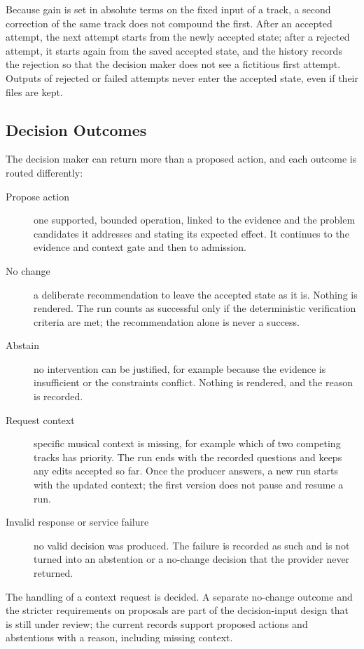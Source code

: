 Because gain is set in absolute terms on the fixed input of a track, a second correction of the same track does not compound the first. After an accepted attempt, the next attempt starts from the newly accepted state; after a rejected attempt, it starts again from the saved accepted state, and the history records the rejection so that the decision maker does not see a fictitious first attempt. Outputs of rejected or failed attempts never enter the accepted state, even if their files are kept.

\subsection{Decision Outcomes}
\label{sec:arch-outcomes}

The decision maker can return more than a proposed action, and each outcome is routed differently:

\begin{description}
	\item[Propose action] one supported, bounded operation, linked to the evidence and the problem candidates it addresses and stating its expected effect. It continues to the evidence and context gate and then to admission.
	\item[No change] a deliberate recommendation to leave the accepted state as it is. Nothing is rendered. The run counts as successful only if the deterministic verification criteria are met; the recommendation alone is never a success.
	\item[Abstain] no intervention can be justified, for example because the evidence is insufficient or the constraints conflict. Nothing is rendered, and the reason is recorded.
	\item[Request context] specific musical context is missing, for example which of two competing tracks has priority. The run ends with the recorded questions and keeps any edits accepted so far. Once the producer answers, a new run starts with the updated context; the first version does not pause and resume a run.
	\item[Invalid response or service failure] no valid decision was produced. The failure is recorded as such and is not turned into an abstention or a no-change decision that the provider never returned.
\end{description}

The handling of a context request is decided. A separate no-change outcome and the stricter requirements on proposals are part of the decision-input design that is still under review; the current records support proposed actions and abstentions with a reason, including missing context.

